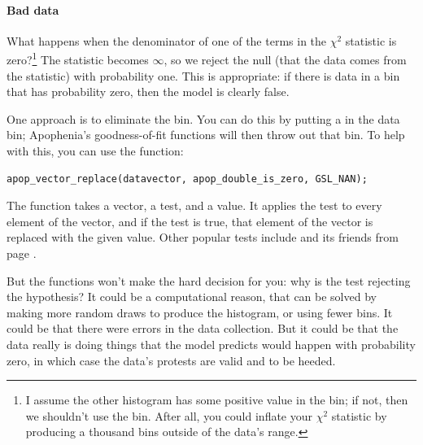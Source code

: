 
\paragraph{\treesymbol Bad data} What happens when the denominator of
one of the terms in the $\chi^2$ statistic is zero?\footnote{I assume
the other histogram has some positive value in the bin; if not, then
we shouldn't use the bin. After all, you could inflate your $\chi^2$
statistic by producing a thousand bins outside of the data's range.} The
statistic becomes $\infty$, so we reject the null (that the data comes
from the statistic) with probability one. This is appropriate: if there is
data in a bin that has probability zero, then the model is clearly false.

One approach is to eliminate the bin. You can do this by putting a
 in the data bin; Apophenia's goodness-of-fit functions will
then throw out that bin. To help with this, you can use the
 function:
\begin{lstlisting}
apop_vector_replace(datavector, apop_double_is_zero, GSL_NAN);
\end{lstlisting}
The function takes a vector, a test, and a  value. It
applies the test to every element of the vector, and if the test is
true, that element of the vector is replaced with the given value. Other
popular tests include  and its friends from page
\pageref{numbers}.

But the functions won't make the hard decision for you: why is the test
rejecting the hypothesis? It could be a computational reason, that can be solved by  making more random draws to produce the histogram, or using fewer bins.
It could be that there were errors in the  data collection.
But it could be that the data really is doing things that the model
predicts would happen with probability zero, in which case the data's
protests are valid and to be heeded.


